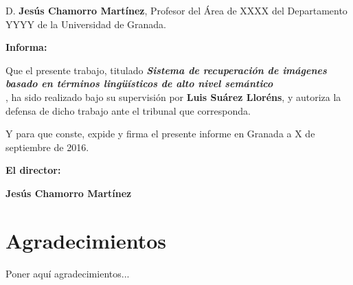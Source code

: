 D. \textbf{Jesús Chamorro Martínez}, Profesor del Área de XXXX del Departamento YYYY de la Universidad de Granada.

\vspace{0.5cm}

\textbf{Informa:}

\vspace{0.5cm}

Que el presente trabajo, titulado \textit{\textbf{Sistema de recuperación de imágenes basado en
términos lingüísticos de alto nivel semántico
\\}},
ha sido realizado bajo su supervisión por \textbf{Luis Suárez Lloréns}, y autoriza la defensa de dicho trabajo ante el tribunal
que corresponda.

\vspace{0.5cm}

Y para que conste, expide y firma el presente informe en Granada a X de septiembre de 2016.

\vspace{1cm}

\textbf{El director:}

\vspace{5cm}

\noindent \textbf{Jesús Chamorro Martínez}

\chapter*{Agradecimientos}
\thispagestyle{empty}

       \vspace{1cm}


Poner aquí agradecimientos...

